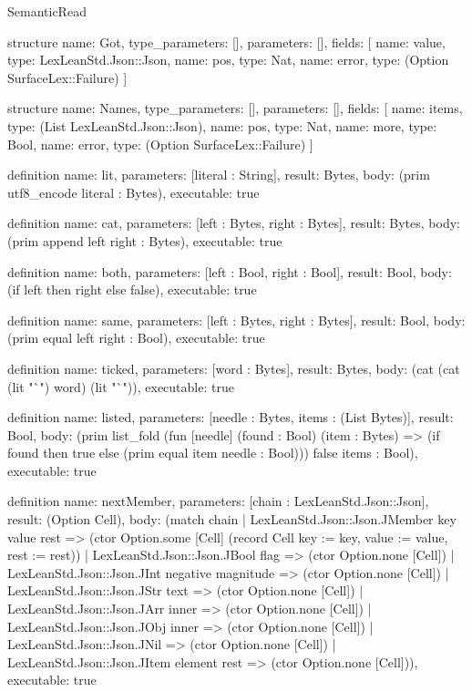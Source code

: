 \begin{lexlean}{SemanticRead}
\begin{semanticmodule}
structure{
  name: Got,
  type_parameters: [],
  parameters: [],
  fields: [
    {name: value, type: LexLeanStd.Json::Json},
    {name: pos, type: Nat},
    {name: error, type: (Option SurfaceLex::Failure)}
  ]
}

structure{
  name: Names,
  type_parameters: [],
  parameters: [],
  fields: [
    {name: items, type: (List LexLeanStd.Json::Json)},
    {name: pos, type: Nat},
    {name: more, type: Bool},
    {name: error, type: (Option SurfaceLex::Failure)}
  ]
}

definition{
  name: lit,
  parameters: [literal : String],
  result: Bytes,
  body: (prim utf8_encode literal : Bytes),
  executable: true
}

definition{
  name: cat,
  parameters: [left : Bytes, right : Bytes],
  result: Bytes,
  body: (prim append left right : Bytes),
  executable: true
}

definition{
  name: both,
  parameters: [left : Bool, right : Bool],
  result: Bool,
  body: (if left then right else false),
  executable: true
}

definition{
  name: same,
  parameters: [left : Bytes, right : Bytes],
  result: Bool,
  body: (prim equal left right : Bool),
  executable: true
}

definition{
  name: ticked,
  parameters: [word : Bytes],
  result: Bytes,
  body: (cat (cat (lit "`") word) (lit "`")),
  executable: true
}

definition{
  name: listed,
  parameters: [needle : Bytes, items : (List Bytes)],
  result: Bool,
  body: (prim list_fold (fun [needle] (found : Bool) (item : Bytes) => (if found then true else (prim equal item needle : Bool))) false items : Bool),
  executable: true
}

definition{
  name: nextMember,
  parameters: [chain : LexLeanStd.Json::Json],
  result: (Option Cell),
  body: (match chain
    | LexLeanStd.Json::Json.JMember key value rest => (ctor Option.some [Cell] (record Cell {key := key, value := value, rest := rest}))
    | LexLeanStd.Json::Json.JBool flag => (ctor Option.none [Cell])
    | LexLeanStd.Json::Json.JInt negative magnitude => (ctor Option.none [Cell])
    | LexLeanStd.Json::Json.JStr text => (ctor Option.none [Cell])
    | LexLeanStd.Json::Json.JArr inner => (ctor Option.none [Cell])
    | LexLeanStd.Json::Json.JObj inner => (ctor Option.none [Cell])
    | LexLeanStd.Json::Json.JNil => (ctor Option.none [Cell])
    | LexLeanStd.Json::Json.JItem element rest => (ctor Option.none [Cell])),
  executable: true
}


\end{semanticmodule}
\end{lexlean}
